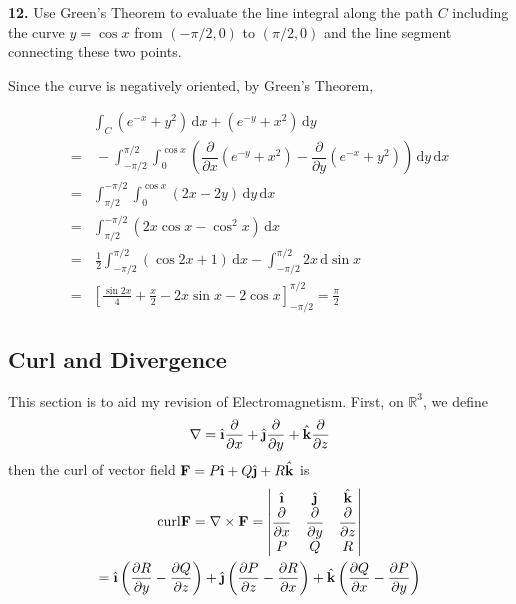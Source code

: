 \documentclass[a4paper,12pt]{article}
\newcommand{\ud}{\,\mathrm{d}}
\newcommand{\curl}{\mathrm{curl}}
\newcommand{\unit}[1]{\hat{\textbf #1}}
\newcommand{\tho}[3][]{\dfrac{\partial #1 #2}{\partial #3 #1}}
\newcommand{\exercise}[1]{\noindent\textbf{#1.}}
\begin{document}
\begin{multicols}{2}
  \noindent{}

  \exercise{12} Use Green's Theorem to evaluate the line integral along the
  path $C$ including the curve $y = \cos x$ from $(-\pi/2, 0)$ to $(\pi/2, 0)$
  and the line segment connecting these two points.

  Since the curve is negatively oriented, by Green's Theorem,
\end{multicols}
\begin{align*}
  &\int_C(e^{-x} + y^2)\ud x + (e^{-y} + x^2)\ud y\\
= &\,-\int_{-\pi/2}^{\pi/2}\int_0^{\cos x}\left(
  \tho{}{x}(e^{-y} + x^2) - \tho{}{y}(e^{-x} + y^2)\right)\ud y\ud x\\
= &\int_{\pi/2}^{-\pi/2}\int_0^{\cos x}(2x - 2y)\ud y\ud x\\
= &\int_{\pi/2}^{-\pi/2}(2x\cos x - \cos^2 x)\ud x\\
= &\,\frac 1 2\int_{-\pi/2}^{\pi/2}(\cos 2x + 1)\ud x
  - \int_{-\pi/2}^{\pi/2}2x\ud\sin x\\
= &\left[\frac{\sin 2x}{4} + \frac{x}{2}
  - 2x\sin x - 2\cos x\right]_{-\pi/2}^{\pi/2} = \frac\pi 2
\end{align*}

\subsection{Curl and Divergence}

This section is to aid my revision of Electromagnetism. First, on $\mathbb R^3$,
we define
\[\nabla = \unit\i\tho{}{x} + \unit\j\tho{}{y} + \unit k\tho{}{z}\]
then the curl of vector field $\mathbf F = P\unit\i + Q\unit\j + R\unit k$ is
\begin{multline*}
  \curl\mathbf F
= \nabla\times\mathbf F
= \begin{vmatrix}
  \unit\i & \unit\j & \unit k\\
  \tho{}{x} & \tho{}{y} & \tho{}{z}\\
  P & Q & R
\end{vmatrix}\\
= \unit\i\left(\tho{R}{y} - \tho{Q}{z}\right)
+ \unit\j\left(\tho{P}{z} - \tho{R}{x}\right)
+ \unit k\left(\tho{Q}{x} - \tho{P}{y}\right)
\end{multline*}
\end{document}
